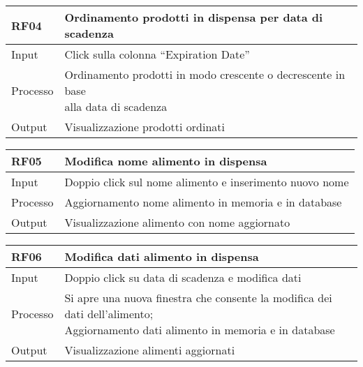 \begin{table}[H]
    \begin{flushleft}
      \begin{tabular}{l|l}
        \toprule
        \textbf{RF04} & \textbf{Ordinamento prodotti in dispensa per data di scadenza}\\
        \midrule
        Input & Click sulla colonna “Expiration Date”\\
        Processo & \makecell{Ordinamento prodotti in modo crescente o decrescente in base \\ alla data di scadenza}\\
        Output & Visualizzazione prodotti ordinati\\
        \bottomrule
      \end{tabular}
    \end{flushleft}
\end{table}

\begin{table}[H]
    \begin{flushleft}
      \begin{tabular}{l|l}
        \toprule
        \textbf{RF05} & \textbf{Modifica nome alimento in dispensa}\\
        \midrule
        Input & Doppio click sul nome alimento e inserimento nuovo nome\\
        Processo & Aggiornamento nome alimento in memoria e in database\\
        Output & Visualizzazione alimento con nome aggiornato\\
        \bottomrule
      \end{tabular}
    \end{flushleft}
\end{table}

\begin{table}[H]
    \begin{flushleft}
      \begin{tabular}{l|l}
        \toprule
        \textbf{RF06} & \textbf{Modifica dati alimento in dispensa}\\
        \midrule
        Input & Doppio click su data di scadenza e modifica dati\\
        Processo & \makecell{Si apre una nuova finestra che consente la modifica dei dati dell’alimento; \\ Aggiornamento dati alimento in memoria e in database}\\
        Output & Visualizzazione alimenti aggiornati\\
        \bottomrule
      \end{tabular}
    \end{flushleft}
\end{table}

